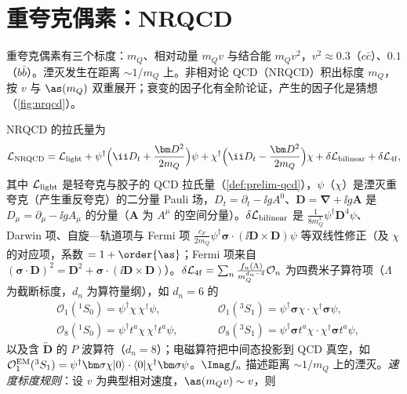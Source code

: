 \section{重夸克偶素：NRQCD}\label{sec:heavy-nrqcd}

重夸克偶素有三个标度：$m_Q$、相对动量 $m_Qv$ 与结合能 $m_Qv^2$，$v^2\approx0.3$（$c\bar c$）、$0.1$（$b\bar b$）\cite[第~II.A~节]{BodwinBraatenLepage1995}。湮灭发生在距离 $\sim1/m_Q$ 上。非相对论 QCD（NRQCD）积出标度 $m_Q$，按 $v$ 与 $\as(m_Q)$ 双重展开\cite{CaswellLepage1986,BodwinBraatenLepage1995}；衰变的因子化有全阶论证，产生的因子化是猜想（\cref{fig:nrqcd}）。

\begin{definition}\label{def:heavy-nrqcd}
NRQCD 的拉氏量为
\begin{equation}\label{eq:heavy-LNRQCD}
\mathcal L_{\rm NRQCD}=\mathcal L_{\rm light}+\psi^\dagger\Big(\ii D_t+\frac{\bm D^2}{2m_Q}\Big)\psi+\chi^\dagger\Big(\ii D_t-\frac{\bm D^2}{2m_Q}\Big)\chi+\delta\mathcal L_{\rm bilinear}+\delta\mathcal L_{\rm 4f},
\end{equation}
其中 $\mathcal L_{\rm light}$ 是轻夸克与胶子的 QCD 拉氏量（\cref{def:prelim-qcd}），$\psi$（$\chi$）是湮灭重夸克（产生重反夸克）的二分量 Pauli 场，$D_t=\partial_t-\ii gA^0$、$\bm D=\bm\nabla+\ii g\bm A$ 是 $D_\mu=\partial_\mu-\ii gA_\mu$ 的分量（$\bm A$ 为 $A^\mu$ 的空间分量）。$\delta\mathcal L_{\rm bilinear}$ 是 $\frac{1}{8m_Q^3}\psi^\dagger\bm D^4\psi$、Darwin 项、自旋—轨道项与 Fermi 项 $\frac{c_F}{2m_Q}\psi^\dagger\bm\sigma\cdot(\ii\bm D\times\bm D)\psi$ 等双线性修正（及 $\chi$ 的对应项，系数 $=1+\order{\as}$；Fermi 项来自 $(\bm\sigma\cdot\bm D)^2=\bm D^2+\bm\sigma\cdot(\ii\bm D\times\bm D)$）。$\delta\mathcal L_{\rm 4f}=\sum_n\frac{f_n(\Lambda)}{m_Q^{d_n-4}}\mathcal O_n$ 为四费米子算符项（$\Lambda$ 为截断标度，$d_n$ 为算符量纲），如 $d_n=6$ 的
\begin{equation}\label{eq:heavy-4f}
\begin{aligned}
&\mathcal O_1({}^1S_0)=\psi^\dagger\chi\,\chi^\dagger\psi,&\qquad&\mathcal O_1({}^3S_1)=\psi^\dagger\bm\sigma\chi\cdot\chi^\dagger\bm\sigma\psi,\\
&\mathcal O_8({}^1S_0)=\psi^\dagger t^a\chi\,\chi^\dagger t^a\psi,&\qquad&\mathcal O_8({}^3S_1)=\psi^\dagger\bm\sigma t^a\chi\cdot\chi^\dagger\bm\sigma t^a\psi,
\end{aligned}
\end{equation}
以及含 $\overleftrightarrow{\bm D}$ 的 $P$ 波算符（$d_n=8$）；电磁算符把中间态投影到 QCD 真空，如 $\mathcal O^{\rm EM}_1({}^3S_1)=\psi^\dagger\bm\sigma\chi|0\rangle\cdot\langle0|\chi^\dagger\bm\sigma\psi$。$\Imag f_n$ 描述距离 $\sim1/m_Q$ 上的湮灭。\emph{速度标度规则}：设 $v$ 为典型相对速度，$\as(m_Qv)\sim v$，则

\end{definition}
